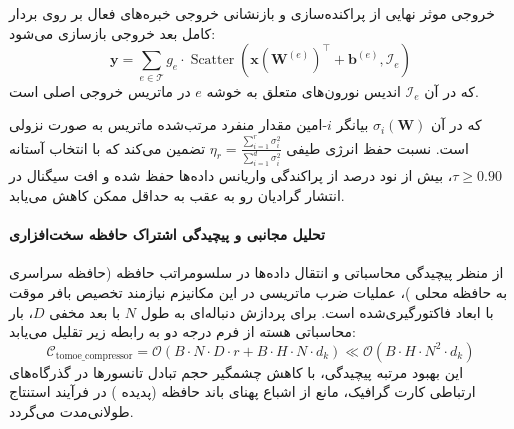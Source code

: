 خروجی موثر نهایی از پراکنده‌سازی و بازنشانی خروجی خبره‌های فعال بر روی بردار کامل بعد خروجی بازسازی می‌شود:
\begin{equation}
\mathbf{y} = \sum_{e \in \mathcal{T}} g_e \cdot \operatorname{Scatter}\left(\mathbf{x} (\mathbf{W}^{(e)})^\top + \mathbf{b}^{(e)}, \mathcal{I}_e\right)
\end{equation}
که در آن $\mathcal{I}_e$ اندیس نورون‌های متعلق به خوشه $e$ در ماتریس خروجی اصلی است.

که در آن $\sigma_i(\mathbf{W})$ بیانگر $i$-امین مقدار منفرد مرتب‌شده ماتریس به صورت نزولی است. نسبت حفظ انرژی طیفی $\eta_r = \frac{\sum_{i=1}^r \sigma_i^2}{\sum_{i=1}^{d} \sigma_i^2}$ تضمین می‌کند که با انتخاب آستانه $\tau \ge 0.90$، بیش از نود درصد از پراکندگی واریانس داده‌ها حفظ شده و افت سیگنال در انتشار گرادیان رو به عقب به حداقل ممکن کاهش می‌یابد.

\paragraph{تحلیل مجانبی و پیچیدگی اشتراک حافظه سخت‌افزاری}
از منظر پیچیدگی محاسباتی و انتقال داده‌ها در سلسومراتب حافظه (حافظه سراسری  به حافظه محلی )، عملیات ضرب ماتریسی در این مکانیزم نیازمند تخصیص بافر موقت با ابعاد فاکتورگیری‌شده است. برای پردازش دنباله‌ای به طول $N$ با بعد مخفی $D$، بار محاسباتی هسته از فرم درجه دو به رابطه زیر تقلیل می‌یابد:
\begin{equation}
\label{eq:complexity_tomoe_compressor}
\mathcal{C}_{\text{tomoe\_compressor}} = \mathcal{O}\left( B \cdot N \cdot D \cdot r + B \cdot H \cdot N \cdot d_k \right) \ll \mathcal{O}\left( B \cdot H \cdot N^2 \cdot d_k \right)
\end{equation}
این بهبود مرتبه پیچیدگی، با کاهش چشمگیر حجم تبادل تانسورها در گذرگاه‌های ارتباطی کارت گرافیک، مانع از اشباع پهنای باند حافظه (پدیده ) در فرآیند استنتاج طولانی‌مدت می‌گردد.

